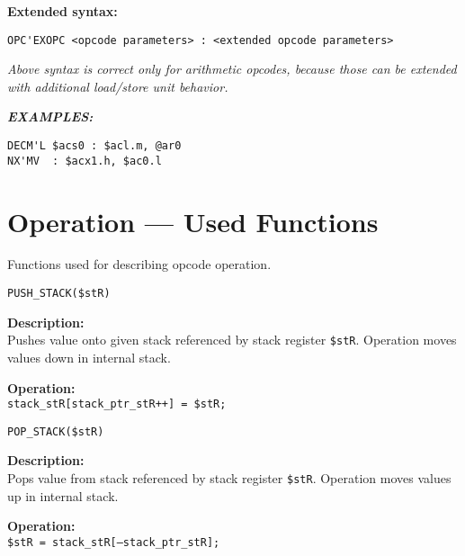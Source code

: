 \documentclass[oneside,english,a4paper,10pt,oneside,openany,final]{memoir}
\newcommand{\Code}[1]{\texttt{#1}}
\newcommand{\Function}[1]{\texttt{#1}}
\newcommand{\Register}[1]{\texttt{#1}}
\begin{document}
\textbf{Extended syntax:}

\begin{lstlisting}[basicstyle=\ttfamily]
OPC'EXOPC <opcode parameters> : <extended opcode parameters>
\end{lstlisting}

\textit{Above syntax is correct only for arithmetic opcodes, because those can be extended with additional load/store unit behavior.}
\vspace{5mm}

\textbf{\textit{EXAMPLES:}}
\begin{lstlisting}[basicstyle=\ttfamily]
DECM'L $acs0 : $acl.m, @ar0
NX'MV  : $acx1.h, $ac0.l
\end{lstlisting}

\pagebreak{}

\section{Operation --- Used Functions}

Functions used for describing opcode operation.

\begin{description}
  \item \Function{PUSH\_STACK(\$stR)}
  \begin{description}
	\item \textbf{Description:} \\ 
      Pushes value onto given stack referenced by stack register \Register{\$stR}. Operation moves values down in internal stack.

    \item \textbf{Operation:} \\
      \Code{stack\_stR[stack\_ptr\_stR++] = \$stR;}
  \end{description}
\end{description}

\begin{description}
  \item \Function{POP\_STACK(\$stR)}
  \begin{description}
	\item \textbf{Description:} \\ 
      Pops value from stack referenced by stack register \Register{\$stR}. Operation moves values up in internal stack.

    \item \textbf{Operation:} \\
      \Code{\$stR = stack\_stR[--stack\_ptr\_stR];}
  \end{description}
\end{description}
\end{document}
